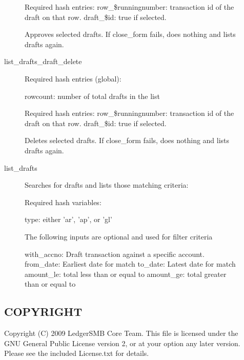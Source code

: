 \begin{description}
\begin{description}
Required hash entries:
row\_\$runningnumber: transaction id of the draft on that row.
draft\_\$id:  true if selected.



Approves selected drafts.  If close\_form fails, does nothing and lists
drafts again.


\item[{list\_drafts\_draft\_delete}] \mbox{}

Required hash entries (global):



rowcount: number of total drafts in the list



Required hash entries:
row\_\$runningnumber: transaction id of the draft on that row.
draft\_\$id:  true if selected.



Deletes selected drafts.  If close\_form fails, does nothing and lists
drafts again.


\item[{list\_drafts}] \mbox{}

Searches for drafts and lists those matching criteria:



Required hash variables:



type:  either 'ar', 'ap', or 'gl'



The following inputs are optional and used for filter criteria



with\_accno: Draft transaction against a specific account.
from\_date:  Earliest date for match
to\_date: Latest date for match
amount\_le: total less than or equal to
amount\_ge: total greater than or equal to

\end{description}
\subsection*{COPYRIGHT\label{LedgerSMB:Scripts::drafts_LedgerSMB_workflow_scripts_for_managing_drafts_COPYRIGHT}}


Copyright (C) 2009 LedgerSMB Core Team.  This file is licensed under the GNU 
General Public License version 2, or at your option any later version.  Please
see the included License.txt for details.


\end{description}
